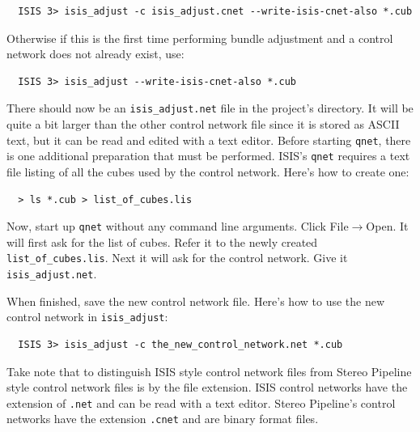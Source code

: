 \begin{verbatim}
  ISIS 3> isis_adjust -c isis_adjust.cnet --write-isis-cnet-also *.cub
\end{verbatim}

Otherwise if this is the first time performing bundle adjustment and a
control network does not already exist, use:

\begin{verbatim}
  ISIS 3> isis_adjust --write-isis-cnet-also *.cub
\end{verbatim}

There should now be an \texttt{isis\_adjust.net} file in the project's
directory. It will be quite a bit larger than the other control
network file since it is stored as ASCII text, but it can be read
and edited with a text editor. Before starting \texttt{qnet}, there
is one additional preparation that must be performed. \ac{ISIS}'s
\texttt{qnet} requires a text file listing of all the cubes used
by the control network. Here's how to create one:

\begin{verbatim}
  > ls *.cub > list_of_cubes.lis
\end{verbatim}

Now, start up \texttt{qnet} without any command line arguments. Click
File$\rightarrow$Open. It will first ask for the list of cubes. Refer
it to the newly created \texttt{list\_of\_cubes.lis}. Next it will ask for
the control network. Give it \texttt{isis\_adjust.net}.

\begin{center}
\end{center}

When finished, save the new control network file. Here's how to use
the new control network in \texttt{isis\_adjust}:

\begin{verbatim}
  ISIS 3> isis_adjust -c the_new_control_network.net *.cub
\end{verbatim}

Take note that to distinguish \ac{ISIS} style control network files
from Stereo Pipeline style control network files is by the file
extension. \ac{ISIS} control networks have the extension of
\texttt{.net} and can be read with a text editor. Stereo Pipeline's
control networks have the extension \texttt{.cnet} and are binary
format files.
